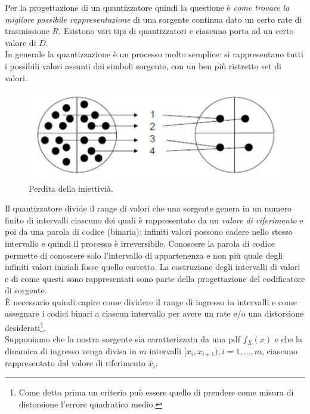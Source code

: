 Per la progettazione di un quantizzatore quindi la questione è \textit{come trovare la migliore possibile
rappresentazione} di una sorgente continua dato un certo rate di trasmissione $R$. Esistono vari tipi di
quantizzatori e ciascuno porta ad un certo valore di $D$.\\
In generale la quantizzazione è un processo molto semplice: si rappresentano tutti i possibili valori assunti
dai simboli sorgente, con un ben più ristretto set di valori.
\begin{figure}[H]
    \centering
    \includegraphics[scale=0.2]{img/quant.jpg}
    \caption{Perdita della iniettivi\`a.}
    \label{fig:quant}
\end{figure}
Il quantizzatore divide il range di valori che una sorgente genera in un numero finito di intervalli ciascuno dei quali è rappresentato da un \textit{valore di riferimento} e poi da una parola di codice (binaria): infiniti valori possono cadere nello stesso intervallo e quindi il processo è irreversibile. Conoscere la parola di codice permette di conoscere solo l’intervallo di appartenenza e non pi\`u quale degli infiniti valori iniziali fosse quello corretto. La costruzione degli intervalli di valori e di come questi sono rappresentati sono parte della progettazione del codificatore di sorgente.\\
È necessario quindi capire come dividere il range di ingresso in intervalli e come assegnare i codici binari a ciascun intervallo per avere un rate e/o una distorsione desiderati\footnote{Come detto prima un criterio può essere quello di prendere come misura di distorsione l’errore quadratico medio.}.\\
Supponiamo che la nostra sorgente sia caratterizzata da una pdf $f_X(x)$ e che la dinamica di ingresso venga
divisa in $m$ intervalli $[x_i, x_{i+1}), i=1,\dots, m$, ciascuno rappresentato dal valore di riferimento $\hat{x}_i$.
